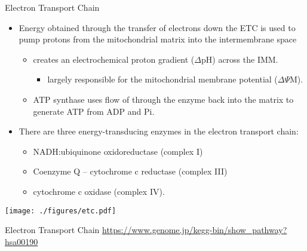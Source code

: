 \documentclass[presentation, smaller]{beamer}
\begin{document}
\begin{frame}[label={sec:orgddac285}]{Electron Transport Chain}
\begin{itemize}
\item Energy obtained through the transfer of electrons down the ETC is
used to pump protons from the mitochondrial matrix into the
intermembrane space
\begin{itemize}
\item creates an electrochemical proton gradient (\(\Delta\)pH) across the IMM.
\begin{itemize}
\item largely responsible for the mitochondrial membrane potential (\(\Delta \Psi\)M).
\end{itemize}
\item ATP synthase uses flow of  through the enzyme back into the
matrix to generate ATP from ADP and Pi.
\end{itemize}
\item There are three energy-transducing enzymes in the electron transport
chain:
\begin{itemize}
\item NADH:ubiquinone oxidoreductase (complex I)
\item Coenzyme Q – cytochrome c reductase (complex III)
\item cytochrome c oxidase (complex IV).
\end{itemize}
\end{itemize}

\begin{center}
\texttt{[image: ./figures/etc.pdf]}
\end{center}
\end{frame}

\begin{frame}[label={sec:orgf17b9b3}]{Electron Transport Chain}
\url{https://www.genome.jp/kegg-bin/show\_pathway?hsa00190}
\end{frame}
\end{document}
